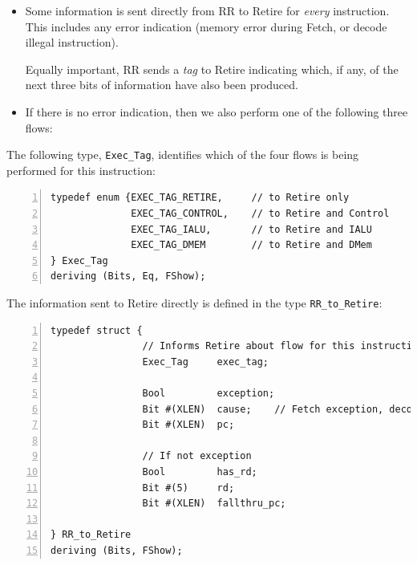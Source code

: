 \begin{itemize}

  \item Some information is sent directly from RR to Retire for
    \emph{every} instruction.  This includes any error indication
    (memory error during Fetch, or decode illegal instruction).

    Equally important, RR sends a \emph{tag} to Retire indicating
    which, if any, of the next three bits of information have also
    been produced.

  \item If there is no error indication, then we also perform one of
  the following three flows:


\end{itemize}

The following type, \verb|Exec_Tag|, identifies which of the four
flows is being performed for this instruction:

{\small
\begin{Verbatim}[frame=single, numbers=left]
typedef enum {EXEC_TAG_RETIRE,     // to Retire only
              EXEC_TAG_CONTROL,    // to Retire and Control
              EXEC_TAG_IALU,       // to Retire and IALU
              EXEC_TAG_DMEM        // to Retire and DMem
} Exec_Tag
deriving (Bits, Eq, FShow);
\end{Verbatim}
}

The information sent to Retire directly is defined in the type
\verb|RR_to_Retire|:

{\small
\begin{Verbatim}[frame=single, numbers=left]
typedef struct {
                // Informs Retire about flow for this instruction
                Exec_Tag     exec_tag;

                Bool         exception;
                Bit #(XLEN)  cause;    // Fetch exception, decode illegal instr
                Bit #(XLEN)  pc;

                // If not exception
                Bool         has_rd;
                Bit #(5)     rd;
                Bit #(XLEN)  fallthru_pc;

} RR_to_Retire
deriving (Bits, FShow);
\end{Verbatim}
}

